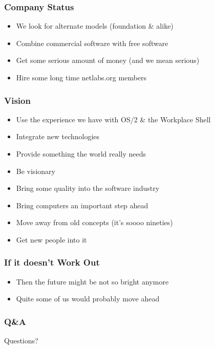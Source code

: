 \documentclass{beamer}
\begin{document}
\begin{frame}
\frametitle{Company Status}
\begin{itemize}
  \item We look for alternate models (foundation \& alike)
  \item Combine commercial software with free software
  \item Get some serious amount of money (and we mean serious)
  \item Hire some long time netlabs.org members
\end{itemize}
\end{frame}

\begin{frame}[allowframebreaks=0.6]
\frametitle{Vision}
\begin{itemize}
  \item Use the experience we have with OS/2 \& the Workplace Shell
  \item Integrate new technologies
  \item Provide something the world really needs
  \item Be visionary
  \item Bring some quality into the software industry
  \item Bring computers an important step ahead
  \item Move away from old concepts (it's soooo nineties)
  \item Get new people into it
\end{itemize}
\end{frame}

\begin{frame}
\frametitle{If it doesn't Work Out
}
\begin{itemize}
  \item Then the future might be not so bright anymore
  \item Quite some of us would probably move ahead
\end{itemize}
\end{frame}

\begin{frame}
\frametitle{Q\&A}
	Questions?
\end{frame}
\end{document}
